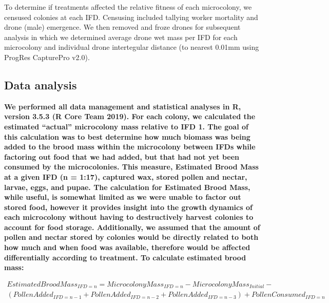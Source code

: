 \documentclass[11pt,]{article}
\begin{document}
To determine if treatments affected the relative fitness of each
microcolony, we censused colonies at each IFD. Censusing included
tallying worker mortality and drone (male) emergence. We then removed
and froze drones for subsequent analysis in which we determined average
drone wet mass per IFD for each microcolony and individual drone
intertegular distance (to nearest 0.01mm using ProgRes CapturePro v2.0).

\hypertarget{data-analysis}{%
\subsection{Data analysis}\label{data-analysis}}

\textbf{We performed all data management and statistical analyses in R,
version 3.5.3 (R Core Team 2019). For each colony, we calculated the
estimated ``actual'' microcolony mass relative to IFD 1. The goal of
this calculation was to best determine how much biomass was being added
to the brood mass within the microcolony between IFDs while factoring
out food that we had added, but that had not yet been consumed by the
microcolonies. This measure, Estimated Brood Mass at a given IFD (n =
1:17), captured wax, stored pollen and nectar, larvae, eggs, and pupae.
The calculation for Estimated Brood Mass, while useful, is somewhat
limited as we were unable to factor out stored food, however it provides
insight into the growth dynamics of each microcolony without having to
destructively harvest colonies to account for food storage.
Additionally, we assumed that the amount of pollen and nectar stored by
colonies would be directly related to both how much and when food was
available, therefore would be affected differentially according to
treatment. To calculate estimated brood mass:}

\[
\begin{aligned}
Estimated Brood Mass_{IFD = n} = Microcolony Mass_{IFD = n} - Microcolony Mass_{Initial} - \\
(Pollen Added_{IFD = n-1} + Pollen Added_{IFD = n-2} + Pollen Added_{IFD = n-3}) + Pollen Consumed_{IFD = n}
\end{aligned}
\]
\end{document}
